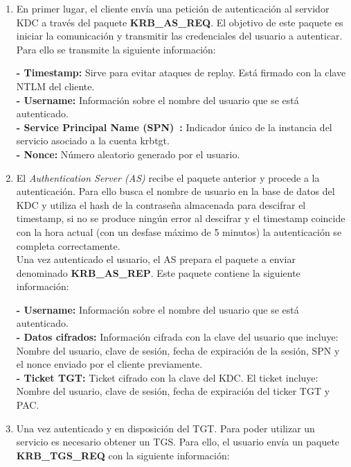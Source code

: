 \begin{enumerate}

\item En primer lugar, el cliente envía una petición de autenticación al servidor KDC a través del paquete \textbf{KRB\_AS\_REQ}. El objetivo de este paquete es iniciar la comunicación y transmitir las credenciales del usuario a autenticar. Para ello se transmite la siguiente información:

\textbf{- Timestamp:} Sirve para evitar ataques de replay. Está firmado con la clave NTLM del cliente.\\
\textbf{- Username:} Información sobre el nombre del usuario que se está autenticado.\\
\textbf{- Service Principal Name (SPN)~\cite{Capitulo3:SPN}:} Indicador único de la instancia del servicio asociado a la cuenta krbtgt. \\
\textbf{- Nonce:} Número aleatorio generado por el usuario. \\

\item El {\it Authentication Server (AS)} recibe el paquete anterior y procede a la autenticación. Para ello busca el nombre de usuario en la base de datos del KDC y utiliza el hash de la contraseña almacenada para descifrar el timestamp, si no se produce ningún error al descifrar y el timestamp coincide con la hora actual (con un desfase máximo de 5 minutos) la autenticación se completa correctamente. \\

Una vez autenticado el usuario, el AS prepara el paquete a enviar denominado \textbf{KRB\_AS\_REP}. Este paquete contiene la siguiente información:

\textbf{- Username:} Información sobre el nombre del usuario que se está autenticado.\\
\textbf{- Datos cifrados:} Información cifrada con la clave del usuario que incluye: Nombre del usuario, clave de sesión, fecha de expiración de la sesión, SPN y el nonce enviado por el cliente previamente. \\
\textbf{- Ticket TGT:} Ticket cifrado con la clave del KDC. El ticket incluye: Nombre del usuario, clave de sesión, fecha de expiración del ticker TGT y PAC. \\

\item Una vez autenticado y en disposición del TGT. Para poder utilizar un servicio es necesario obtener un TGS. Para ello, el usuario envía un paquete \textbf{KRB\_TGS\_REQ} con la siguiente información:


\end{enumerate}
